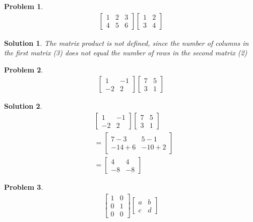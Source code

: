 \documentclass{article}
\newtheorem{problem}{Problem}
\newtheorem*{solution}{Solution}
\begin{document}
\begin{problem}
\begin{align*}
\begin{bmatrix}
1 & 2 & 3 \\ 4 & 5 & 6
\end{bmatrix}
\begin{bmatrix}
1 & 2 \\ 3 & 4
\end{bmatrix}
\end{align*}
\end{problem}

\begin{solution}
The matrix product is not defined, since the number of columns in the first matrix (3) does not equal the number of rows in the second matrix (2)
\end{solution}

\begin{problem}
\begin{align*}
\begin{bmatrix}
1 & -1 \\ -2 & 2
\end{bmatrix}
\begin{bmatrix}
7 & 5 \\ 3 & 1
\end{bmatrix}
\end{align*}
\end{problem}

\begin{solution}
\begin{align*}
& \begin{bmatrix}
1 & -1 \\ -2 & 2
\end{bmatrix}
\begin{bmatrix}
7 & 5 \\ 3 & 1
\end{bmatrix} \\
&= \begin{bmatrix}
7-3 & 5-1 \\ -14+6 & -10 + 2
\end{bmatrix} \\
&= \begin{bmatrix}
4 & 4 \\ -8 & -8
\end{bmatrix} 
\end{align*}
\end{solution}

\begin{problem}
\begin{align*}
\begin{bmatrix}
1 & 0 \\ 0 & 1 \\ 0 & 0 
\end{bmatrix}
\begin{bmatrix}
a & b \\ c & d
\end{bmatrix}
\end{align*}
\end{problem}
\end{document}
